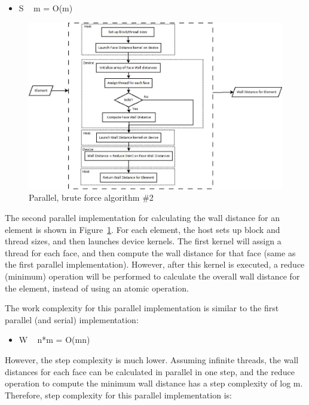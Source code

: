 \documentclass[]{aiaa-tc}%
\begin{document}
\begin{itemize}
  \item S ~ m = O(m)
\end{itemize}


\begin{figure}
  \includegraphics{figures/brute_force/bf_parallel2_block}
  \caption{Parallel, brute force algorithm \#2}
  \label{f:bf_parallel2}
\end{figure}

The second parallel implementation for calculating the wall distance for an element is shown in Figure~\ref{f:bf_parallel2}.  For each element, the host sets up block and thread sizes, and then launches device kernels.  The first kernel will assign a thread for each face, and then compute the wall distance for that face (same as the first parallel implementation).  However, after this kernel is executed, a reduce (minimum) operation will be performed to calculate the overall wall distance for the element, instead of using an atomic operation.  

The work complexity for this parallel implementation is similar to the first parallel (and serial) implementation:

\begin{itemize}
  \item W ~ n*m = O(mn)
\end{itemize}

However, the step complexity is much lower.  Assuming infinite threads, the wall distances for each face can be calculated in parallel in one step, and the reduce operation to compute the minimum wall distance has a step complexity of log m.  Therefore, step complexity for this parallel implementation is: 
\end{document}
